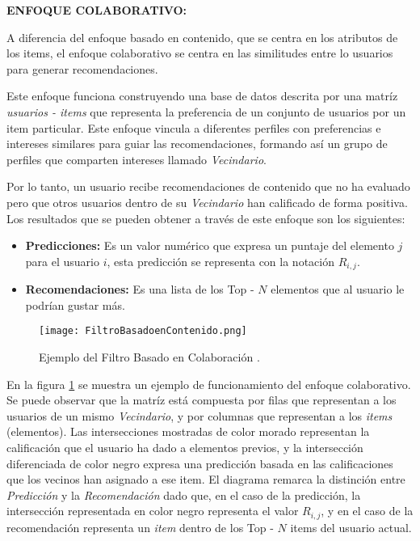 \newpage
\thispagestyle{plain}
\vspace*{0.2cm}

\textbf{ENFOQUE COLABORATIVO:}

A diferencia del enfoque basado en contenido, que se centra en los atributos de los items, el enfoque colaborativo se centra en las similitudes entre lo usuarios para generar recomendaciones.

Este enfoque funciona construyendo una base de datos descrita por una matríz \textit{usuarios - items} que representa la preferencia de un conjunto de usuarios por un item particular. Este enfoque vincula a diferentes perfiles con preferencias e intereses similares para guiar las recomendaciones, formando así un grupo  de perfiles que comparten intereses llamado \textit{Vecindario}. 


Por lo tanto, un usuario recibe recomendaciones de contenido que no ha evaluado pero que otros usuarios dentro de su \textit{Vecindario} han calificado de forma positiva. Los resultados que se pueden obtener a través de este enfoque son los siguientes:

\begin{itemize}
    \item \textbf{Predicciones: } Es un valor numérico que expresa un puntaje del elemento $j$ para el usuario $i$, esta predicción se representa con la notación $R_{i,j}$.
    \item \textbf{Recomendaciones: } Es una lista de los Top - $N$ elementos que al usuario le podrían gustar más.
\end{itemize}

\begin{figure}[h!]
    \centering
    \texttt{[image: FiltroBasadoenContenido.png]}
    \caption{Ejemplo del Filtro Basado en Colaboración \parencite{ISINKAYE2015261}.}
    \label{fig:FiltroColaborativo}
\end{figure}

\newpage
\thispagestyle{plain}
\vspace*{0.2cm}


En la figura \ref{fig:FiltroColaborativo} se muestra un ejemplo de funcionamiento del enfoque colaborativo. Se puede observar que la matríz está compuesta por filas que representan a los usuarios de un mismo \textit{Vecindario}, y por columnas que representan a los \textit{items} (elementos). Las intersecciones mostradas de color morado representan la calificación que el usuario ha dado a elementos previos, y la intersección diferenciada de color negro expresa una predicción basada en las calificaciones que los vecinos han asignado a ese item.
El diagrama remarca la distinción entre \textit{Predicción} y la \textit{Recomendación} dado que, en el caso de la predicción,  la intersección representada en color negro representa el valor $R_{i,j}$, y en el caso de la recomendación representa un \textit{item} dentro de los Top - $N$ items del usuario actual.


